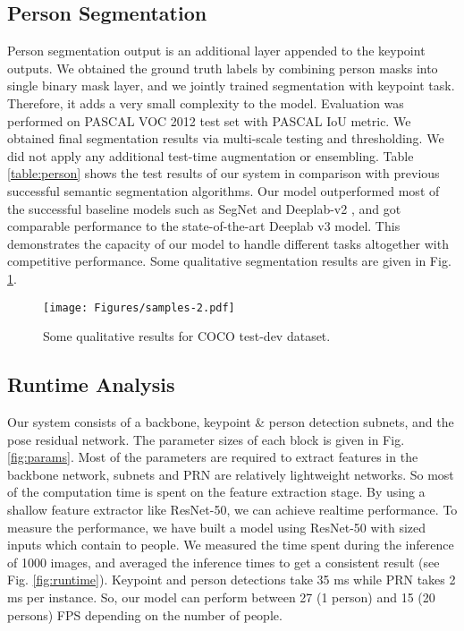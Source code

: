 \documentclass[runningheads]{llncs}
\begin{document}
\subsection{Person Segmentation}
Person segmentation output is an additional layer appended to the keypoint outputs. We obtained the ground truth labels by combining person masks into single binary mask layer, and we jointly trained segmentation with keypoint task. Therefore, it adds a very small complexity to the model. Evaluation was performed on PASCAL VOC 2012 test set with PASCAL IoU metric. We obtained final segmentation results via multi-scale testing and thresholding. We did not apply any additional test-time augmentation or ensembling. Table \ref{table:person} shows the test results of our system in comparison with previous successful semantic segmentation algorithms. Our model outperformed most of the successful baseline models such as SegNet \cite{kendall2015bayesian} and Deeplab-v2 \cite{Chen2016}, and got comparable performance to the state-of-the-art Deeplab v3 \cite{Chen} model. This demonstrates the capacity of our model to handle different tasks altogether with competitive performance. Some qualitative segmentation results are given in Fig. \ref{fig:samples}.


\begin{figure}
\centering
\texttt{[image: Figures/samples-2.pdf]}
\caption{Some qualitative results for COCO test-dev dataset.}
\label{fig:samples}
\end{figure}


\subsection{Runtime Analysis}
Our system consists of a backbone, keypoint \& person detection subnets, and the pose residual network. The parameter sizes of each block is given in Fig. \ref{fig:params}. Most of the parameters are required to extract features in the backbone network, subnets and PRN are relatively lightweight networks. So most of the computation time is spent on the feature extraction stage. By using a shallow feature extractor like ResNet-50, we can achieve realtime performance. To measure the performance, we have built a model using ResNet-50 with  sized inputs which contain  to  people. We measured the time spent during the inference of 1000 images, and averaged the inference times to get a consistent result (see Fig. \ref{fig:runtime}). Keypoint and person detections take 35 ms while PRN takes 2 ms per instance. So, our model can perform between 27 (1 person) and 15 (20 persons) FPS depending on the number of people. 
\end{document}
